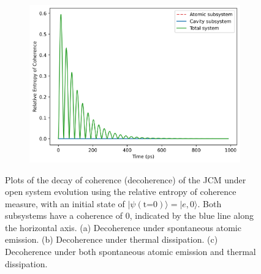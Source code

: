 \documentclass[11pt]{article}
\begin{document}
\begin{figure}[H]
    \vspace{0.5cm}
    
    \begin{subfigure}{0.45\textwidth}
        \centering
        \includegraphics[width=\linewidth]{Research Project/Code/results/JCM/OQS_Coh_Both.png}
        \caption{}
        \label{fig:JCM_OQS_Coh_Both}
    \end{subfigure}
    \hfill
    \caption{Plots of the decay of coherence (decoherence) of the JCM under open system evolution using the relative entropy of coherence measure, with an initial state of $|\psi (\text{t=0})\rangle = |e, 0\rangle$. Both subsystems have a coherence of 0, indicated by the blue line along the horizontal axis. (a) Decoherence under spontaneous atomic emission. (b) Decoherence under thermal dissipation. (c) Decoherence under both spontaneous atomic emission and thermal dissipation.}
    \label{fig:JCM_OQS_Coh}
\end{figure}
\end{document}
